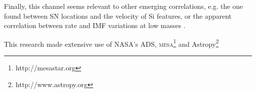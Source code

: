 \documentclass{aa}
\begin{document}
Finally, this channel seems relevant to other emerging correlations, e.g. the one found between SN locations and the velocity of Si features, or the apparent correlation between \ia rate and IMF variations at low masses \citep{Maoz:2013hna}.                                             



\begin{acknowledgements}
%
 This research made extensive use of NASA's ADS, \textsc{mesa}\footnote{http://mesastar.org} \citep{Paxton:2010ji,Paxton:2013pj,Paxton:2015jva,Paxton:2017eie} and Astropy\footnote{http://www.astropy.org} \citep{Price-Whelan:2018hus}
\end{acknowledgements}


 

\end{document}
